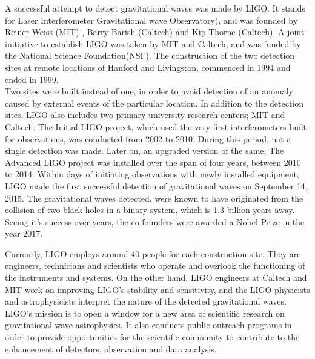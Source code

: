A successful attempt to detect gravitational waves was made by LIGO. It stands for Laser Interferometer Gravitational wave Observatory), and was founded by Reiner Weiss (MIT) , Barry Barish (Caltech) and Kip Thorne (Caltech). A joint - initiative to establish LIGO was taken by MIT and Caltech, and was funded by the National Science Foundation(NSF). The construction of the two detection sites at remote locations of Hanford and Livingston, commenced in 1994 and ended in 1999. \\

Two sites were built instead of one, in order to avoid detection of an anomaly caused by external events of the particular location. In addition to the detection sites, LIGO also includes two primary university research centers; MIT and Caltech. The Initial LIGO project, which used the very first interferometers built for observations, was conducted from 2002 to 2010. During this period, not a single detection was made. Later on, an upgraded version of the same, The Advanced LIGO project was installed over the span of four years, between 2010 to 2014. Within days of initiating observations with newly installed equipment, LIGO made the first successful detection of gravitational waves on September 14, 2015. The gravitational waves detected, were known to have originated from the collision of two black holes in a binary system, which is 1.3 billion years away. Seeing it’s success over years, the co-founders were awarded a Nobel Prize in the year 2017.

Currently, LIGO employs around 40 people for each construction site. They are engineers, technicians and scientists who operate and overlook the functioning of the instruments and systems. On the other hand, LIGO engineers at Caltech and MIT work on improving LIGO’s stability and sensitivity, and the LIGO physicists and astrophysicists interpret the nature of the detected gravitational waves. LIGO’s mission is to open a window for a new area of scientific research on gravitational-wave astrophysics. It also conducts public outreach programs in order to provide opportunities for the scientific community to contribute to the enhancement of detectors, observation and data analysis. 

